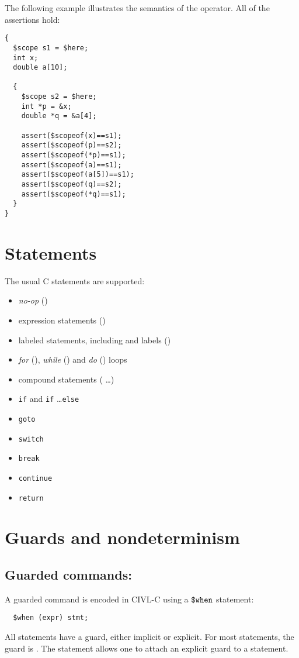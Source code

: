 The following example illustrates the semantics of the \cscopeof{}
operator.  All of the assertions hold:
\begin{verbatim}
{
  $scope s1 = $here;
  int x;
  double a[10];

  {
    $scope s2 = $here;
    int *p = &x;
    double *q = &a[4];

    assert($scopeof(x)==s1);
    assert($scopeof(p)==s2);
    assert($scopeof(*p)==s1);
    assert($scopeof(a)==s1);
    assert($scopeof(a[5])==s1);
    assert($scopeof(q)==s2);
    assert($scopeof(*q)==s1);
  }
}  
\end{verbatim}

\section{Statements}

The usual C statements are supported:
\begin{itemize}
\item \emph{no-op} (\ct{;})
\item expression statements ()
\item labeled statements, including  and  labels
  ()
\item \emph{for} (), \emph{while} 
  () and \emph{do} ()
  loops
\item compound statements (\lb {} \ldots \rb)
\item \texttt{if} and \verb!if! \ldots \verb!else!
\item \verb!goto!
\item \verb!switch!
\item \verb!break!
\item \verb!continue!
\item \verb!return!
\end{itemize}

\section{Guards and nondeterminism}

\subsection{Guarded commands: \cwhen}

A guarded command is encoded in CIVL-C using a $\mbox{\texttt{\${}when}}$ statement:
\begin{verbatim}
  $when (expr) stmt;
\end{verbatim}
All statements have a guard, either implicit or explicit.  For most
statements, the guard is \ctrue.  The \cwhen{} statement allows one to
attach an explicit guard to a statement.

